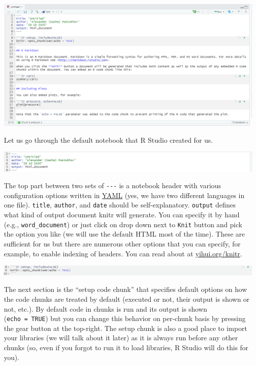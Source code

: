 \documentclass[
]{book}
\begin{document}
\begin{center}\includegraphics[width=1\linewidth]{images/default-notebook} \end{center}

Let us go through the default notebook that R Studio created for us.

\begin{center}\includegraphics[width=1\linewidth]{images/notebook-header} \end{center}

The top part between two sets of \texttt{-\/-\/-} is a notebook header with various configuration options written in \href{https://yaml.org/}{YAML} (yes, we have two different languages in one file). \texttt{title}, \texttt{author}, and \texttt{date} should be self-explanatory. \texttt{output} defines what kind of output document knitr will generate. You can specify it by hand (e.g., \texttt{word\_document}) or just click on drop down next to \texttt{Knit} button and pick the option you like (we will use the default HTML most of the time). These are sufficient for us but there are numerous other options that you can specify, for example, to enable indexing of headers. You can read about at \href{https://yihui.org/knitr/}{yihui.org/knitr}.

\begin{center}\includegraphics[width=1\linewidth]{images/notebook-setup} \end{center}

The next section is the ``setup code chunk'' that specifies default options on how the code chunks are treated by default (executed or not, their output is shown or not, etc.). By default code in chunks is run and its output is shown (\texttt{echo\ =\ TRUE}) but you can change this behavior on per-chunk basis by pressing the gear button at the top-right. The setup chunk is also a good place to import your libraries (we will talk about it later) as it is always run before any other chunks (so, even if you forgot to run it to load libraries, R Studio will do this for you).
\end{document}
